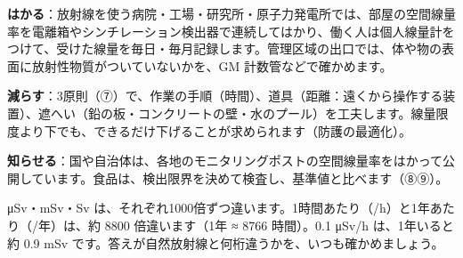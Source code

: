 \begin{phkougaku}
\textbf{はかる}：放射線を使う病院・工場・研究所・原子力発電所では、部屋の空間線量率を電離箱やシンチレーション検出器で連続してはかり、働く人は個人線量計をつけて、受けた線量を毎日・毎月記録します。管理区域の出口では、体や物の表面に放射性物質がついていないかを、GM 計数管などで確かめます。

\textbf{減らす}：3原則（⑦）で、作業の手順（時間）、道具（距離：遠くから操作する装置）、遮へい（鉛の板・コンクリートの壁・水のプール）を工夫します。線量限度より下でも、できるだけ下げることが求められます（防護の最適化）。

\textbf{知らせる}：国や自治体は、各地のモニタリングポストの空間線量率をはかって公開しています。食品は、検出限界を決めて検査し、基準値と比べます（⑧⑨）。

\begin{phketa}[線量の目安]
\si{\micro Sv}・mSv・Sv は、それぞれ1000倍ずつ違います。1時間あたり（/h）と1年あたり（/年）は、約 \num{8800} 倍違います（1年 ≈ 8766 時間）。0.1 \si{\micro Sv/h} は、1年いると約 0.9 mSv です。答えが自然放射線と何桁違うかを、いつも確かめましょう。
\end{phketa}
\end{phkougaku}

